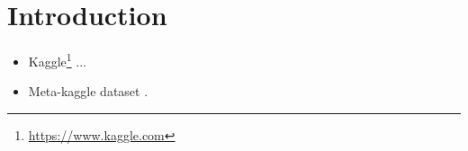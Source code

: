 \documentclass[mnsc]{informs3}
\begin{document}
\maketitle

%



\section{Introduction}

\begin{itemize}
\item Kaggle\footnote{\url{https://www.kaggle.com}} ...
\item Meta-kaggle dataset \cite{megan_risdal_timo_bozsolik_2022}. 
\end{itemize}
\end{document}
